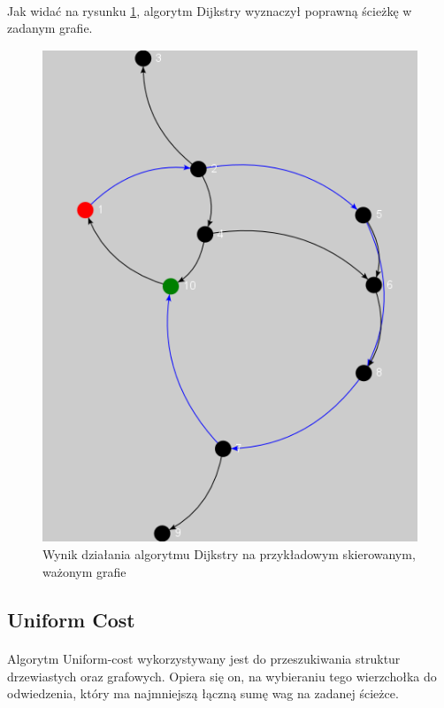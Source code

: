 \paragraph{}
Jak widać na rysunku \ref{fig:dijkstra}, algorytm Dijkstry wyznaczył poprawną ścieżkę w zadanym grafie.

\begin{figure}[!h]
 \centering
 \includegraphics{algorithms/dijkstra}
 \caption{Wynik działania algorytmu Dijkstry na przykładowym skierowanym, ważonym grafie}
 \label{fig:dijkstra}
\end{figure}

\subsection{Uniform Cost}
\paragraph{}
Algorytm Uniform-cost wykorzystywany jest do przeszukiwania struktur drzewiastych oraz grafowych.
Opiera się on, na wybieraniu tego wierzchołka do odwiedzenia, który ma najmniejszą łączną sumę wag na zadanej ścieżce.

